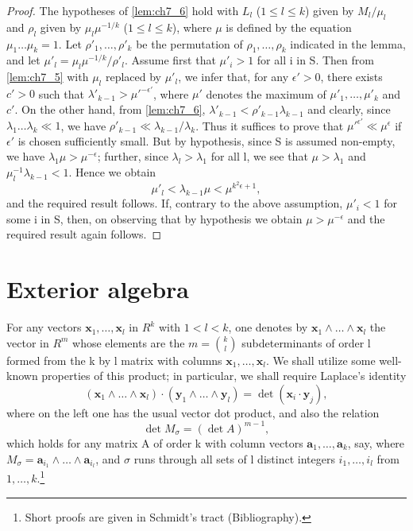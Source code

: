 \begin{proof}
The hypotheses of \autoref{lem:ch7_6} hold with $L_l$ ($1 \le l \le k$) given by $M_l/\mu_l$ and $\rho_l$ given by $\mu_l \mu^{-1/k}$ ($1 \le l \le k$), where $\mu$ is defined by the equation $\mu_1 \dots \mu_k = 1$. Let $\rho'_1, \dots, \rho'_k$ be the permutation of $\rho_1, \dots, \rho_k$ indicated in the lemma, and let $\mu'_l = \mu_l \mu^{-1/k}/\rho'_l$. Assume first that $\mu'_i > 1$ for all i in S. Then from \autoref{lem:ch7_5} with $\mu_l$ replaced by $\mu'_l$, we infer that, for any $\epsilon' > 0$, there exists $c' > 0$ such that $\lambda'_{k-1} > \mu'^{-\epsilon'}$, where $\mu'$ denotes the maximum of $\mu'_1, \dots, \mu'_k$ and $c'$. On the other hand, from \autoref{lem:ch7_6}, $\lambda'_{k-1} < \rho'_{k-1} \lambda_{k-1}$ and clearly, since $\lambda_1 \dots \lambda_k \ll 1$, we have $\rho'_{k-1} \ll \lambda_{k-1}/\lambda_k$. Thus it suffices to prove that $\mu'^{\epsilon'} \ll \mu^\epsilon$ if $\epsilon'$ is chosen sufficiently small. But by hypothesis, since S is assumed non-empty, we have $\lambda_1 \mu > \mu^{-\epsilon}$; further, since $\lambda_l > \lambda_1$ for all l, we see that $\mu > \lambda_1$ and $\mu_l^{-1} \lambda_{k-1} < 1$. Hence we obtain
\[\mu'_l < \lambda_{k-1}\mu < \mu^{k^2\epsilon+1},\]
and the required result follows. If, contrary to the above assumption, $\mu'_i < 1$ for some i in S, then, on observing that by hypothesis we obtain $\mu > \mu^{-\epsilon}$ and the required result again follows.
\end{proof}

\section{Exterior algebra}\label{sec:ch7_9}

For any vectors $\mathbf{x}_1, \dots, \mathbf{x}_l$ in $R^k$ with $1 < l < k$, one denotes by $\mathbf{x}_1 \wedge \dots \wedge \mathbf{x}_l$ the vector in $R^m$ whose elements are the $m = \binom{k}{l}$ subdeterminants of order l formed from the k by l matrix with columns $\mathbf{x}_1, \dots, \mathbf{x}_l$. We shall utilize some well-known properties of this product; in particular, we shall require Laplace's identity
\[( \mathbf{x}_1 \wedge \dots \wedge \mathbf{x}_l ) \cdot ( \mathbf{y}_1 \wedge \dots \wedge \mathbf{y}_l ) = \operatorname{det}(\mathbf{x}_i \cdot \mathbf{y}_j),\]
where on the left one has the usual vector dot product, and also the relation
\[\operatorname{det} M_\sigma = (\operatorname{det} A)^{m-1},\]
which holds for any matrix A of order k with column vectors $\mathbf{a}_1, \dots, \mathbf{a}_k$, say, where $M_\sigma = \mathbf{a}_{i_1} \wedge \dots \wedge \mathbf{a}_{i_l}$, and $\sigma$ runs through all sets of l distinct integers $i_1, \dots, i_l$ from $1, \dots, k$.\footnote{Short proofs are given in Schmidt's tract (Bibliography).}

